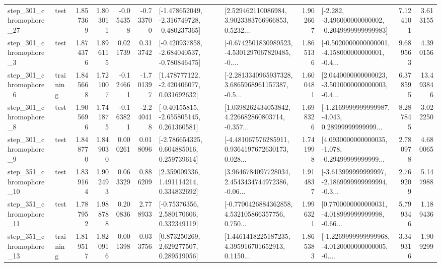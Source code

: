 \begin{tabular}{llrrrrllrlrr}
  step\_301\_chromophore\_27 &      test &      1.857369 &    1.803011 &     -0.054358 & -0.733700 &  [-1.478652049, -2.316749728, -0.480237365] &  [2.529462110086984, 3.9023383766966853, 0.5232... &       1.902667 &  [-2.282, -3.496000000000002, -0.2049999999999983] &            7.124101 &          3.613155 \\
   step\_301\_chromophore\_3 &      test &      1.874376 &    1.896115 &      0.021739 &  0.313742 &  [-0.420937858, -2.684040537, -0.780846475] &  [-0.6742501830989523, -4.5301297067820485, -0.... &       1.865136 &  [-0.5020000000000001, -4.158000000000001, -0.4... &            9.689563 &          4.390156 \\
   step\_301\_chromophore\_6 &  training &      1.845668 &    1.721007 &     -0.124661 & -1.701397 &    [1.478777122, -2.420406077, 0.031692632] &  [-2.2813340965937328, 3.6865968961157387, -0.5... &       1.600481 &  [2.0440000000000023, -3.5010000000000003, -0.4... &            6.378595 &         13.493846 \\
   step\_301\_chromophore\_8 &      test &      1.905696 &    1.741875 &     -0.163821 & -2.240418 &    [-0.40155815, -2.655805145, 0.261360581] &  [1.0398262434053842, 4.226682860803714, -0.357... &       1.698326 &  [-1.2169999999999987, -4.043, 0.28999999999999... &            8.287845 &          3.022250 \\
   step\_301\_chromophore\_9 &      test &      1.848770 &    1.849030 &      0.000261 &  0.018096 &    [-2.786654325, 0.604885016, 0.259739614] &  [-4.481067576285911, 0.9364197672630173, 0.028... &       1.741998 &  [4.0930000000000035, -1.078, -0.29499999999999... &            2.780978 &          4.680065 \\
  step\_351\_chromophore\_10 &      test &      1.839164 &    1.902493 &      0.063329 &  0.886209 &     [2.359009336, 1.491114214, 0.334832692] &  [3.9646784097728034, 2.4543434744972386, -0.06... &       1.914837 &  [-3.613999999999997, -2.1869999999999994, -0.3... &            2.769209 &          5.147988 \\
  step\_351\_chromophore\_11 &      test &      1.787952 &    1.988788 &      0.200836 &  2.778933 &     [-0.75376356, 2.580170606, 0.332349119] &  [-0.7700426884362858, 4.532105866357756, 0.750... &       1.996321 &  [0.7700000000000031, -4.018999999999998, -0.66... &            5.799346 &          1.189436 \\
  step\_351\_chromophore\_13 &  training &      1.819517 &    1.820916 &      0.001398 &  0.033756 &     [0.873250269, 2.629277507, 0.289519056] &  [1.4461418225187235, 4.395916701652913, 0.1150... &       1.865383 &  [-1.2269999999999968, -4.0120000000000005, -0.... &            3.349316 &          1.909299 \\

\end{tabular}
